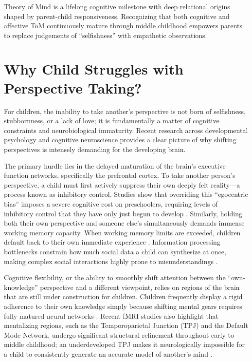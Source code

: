 \begin{keyinsight}
Theory of Mind is a lifelong cognitive milestone with deep relational origins shaped by parent-child responsiveness. 
Recognizing that both cognitive and affective ToM continuously mature through middle childhood empowers parents to replace judgements of ``selfishness'' with empathetic observations.
\end{keyinsight}

\section{Why Child Struggles with Perspective Taking?}

For children, the inability to take another's perspective is not born of selfishness, stubbornness, or a lack of love; it is fundamentally a matter of cognitive constraints and neurobiological immaturity. 
Recent research across developmental psychology and cognitive neuroscience provides a clear picture of why shifting perspectives is intensely demanding for the developing brain.

The primary hurdle lies in the delayed maturation of the brain's executive function networks, specifically the prefrontal cortex. 
To take another person's perspective, a child must first actively suppress their own deeply felt reality---a process known as inhibitory control. 
Studies show that overriding this ``egocentric bias'' imposes a severe cognitive cost on preschoolers, requiring levels of inhibitory control that they have only just begun to develop \citep{blankenship2024, carlson2024b}. 
Similarly, holding both their own perspective and someone else’s simultaneously demands immense working memory capacity. 
When working memory limits are exceeded, children default back to their own immediate experience \citep{richardson2025}. 
Information processing bottlenecks constrain how much social data a child can synthesize at once, making complex social interactions highly prone to misunderstandings \citep{gweon2024}.

Cognitive flexibility, or the ability to smoothly shift attention between the ``own-knowledge'' perspective and a different viewpoint, relies on regions of the brain that are still under construction for children. 
Children frequently display a rigid adherence to their own knowledge simply because shifting mental gears requires fully matured neural networks \citep{zaitchik2025, moriguchi2025}. 
Recent fMRI studies also highlight that mentalizing regions, such as the Temporoparietal Junction (TPJ) and the Default Mode Network, undergo significant structural refinement throughout early to middle childhood; an underdeveloped TPJ makes it neurologically impossible for a child to consistently generate an accurate model of another's mind \citep{saxe2025}.


